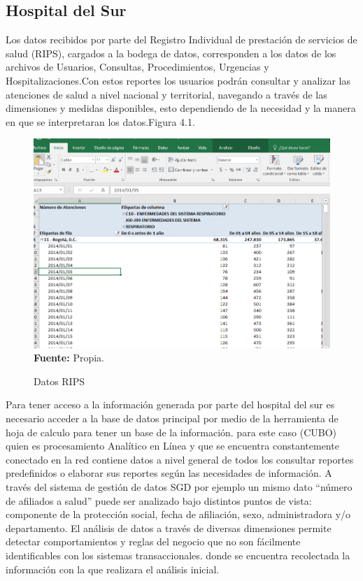 \documentclass[a4paper,openright,12pt]{book}
\theoremstyle{definition}
\theoremstyle{remark}
\begin{document}
\subsection{Hospital del Sur}
Los datos recibidos por parte del Registro Individual de prestación de servicios de salud (RIPS), cargados a la bodega de datos, corresponden a los datos de los archivos de Usuarios, Consultas, Procedimientos, Urgencias y Hospitalizaciones.Con estos reportes los usuarios podrán consultar y analizar las atenciones de salud a nivel nacional y territorial, navegando a través de las dimensiones y medidas disponibles, esto dependiendo de la necesidad y la manera en que se interpretaran los datos.Figura 4.1.

\begin{figure}[ht]
\centering
\caption{Datos RIPS} 
\includegraphics[scale=0.6]{prepa2}
\label{fig:Rips6}
\\ \textbf{Fuente:} Propia.
\end{figure}


Para tener acceso a la información generada por parte del hospital del sur es necesario acceder  a la base de datos principal por medio de la herramienta de  hoja de calculo para tener un base de la información. para este caso (CUBO) quien es procesamiento Analítico en Línea y que se encuentra constantemente conectado en la red contiene datos a nivel general de todos los consultar reportes predefinidos o elaborar sus reportes según las necesidades de información. A través del sistema de gestión de datos SGD por ejemplo un mismo dato “número de afiliados a salud” puede ser analizado bajo distintos puntos de vista: componente de la protección social, fecha de afiliación, sexo, administradora y/o departamento. El análisis de datos a través de diversas dimensiones permite detectar comportamientos y reglas del negocio que no son fácilmente identificables con los sistemas transaccionales.
donde se encuentra recolectada la información con la que realizara el análisis inicial.
\end{document}

